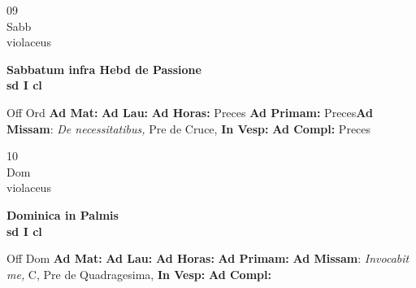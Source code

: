 \documentclass[10pt, openany]{book}
\begin{document}
        \begin{center}
            \begin{minipage}{3.5in}
                \vspace{2em}
                \begin{minipage}{0.5in}
                    {\Huge 09} \\
                    {\normalsize Sabb} \\
                    {\normalsize violaceus}
                \end{minipage}
                \begin{minipage}{3.0in}
                    \textbf{ \large Sabbatum infra Hebd de Passione \\
                    \textnormal{\normalsize sd I cl}} \\ 
                \end{minipage}
                \begin{justify}Off Ord
                    \textbf{Ad Mat: }
                    \textbf{Ad Lau: }
                    \textbf{Ad Horas: }Preces
                    \textbf{Ad Primam: }Preces\textbf{Ad Missam}: \textit{De necessitatibus,} Pre de Cruce,  
                    \textbf{In Vesp: }
                    \textbf{Ad Compl: }Preces
                \end{justify}
            \end{minipage}
        \end{center}
    
        \begin{center}
            \begin{minipage}{3.5in}
                \vspace{2em}
                \begin{minipage}{0.5in}
                    {\Huge 10} \\
                    {\normalsize Dom} \\
                    {\normalsize violaceus}
                \end{minipage}
                \begin{minipage}{3.0in}
                    \textbf{ \large Dominica in Palmis \\
                    \textnormal{\normalsize sd I cl}} \\ 
                \end{minipage}
                \begin{justify}Off Dom
                    \textbf{Ad Mat: }
                    \textbf{Ad Lau: }
                    \textbf{Ad Horas: }
                    \textbf{Ad Primam: }\textbf{Ad Missam}: \textit{Invocabit me,} C, Pre de Quadragesima,  
                    \textbf{In Vesp: }
                    \textbf{Ad Compl: }
                \end{justify}
            \end{minipage}
        \end{center}
    
\end{document}
